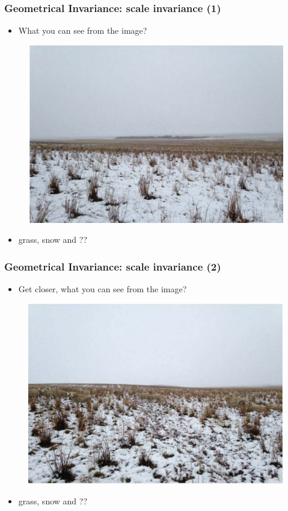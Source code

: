 \begin{frame}
\frametitle {Geometrical Invariance: scale invariance (1)}
\begin{itemize}
	\item {What you can see from the image?}
\end{itemize}
\begin{figure}
	{\includegraphics[width=0.7\linewidth]{./figs/scale_sheep1.pdf}}
\end{figure}
\begin{itemize}
	\item {grass, snow and ??}
\end{itemize}
\end{frame}

\begin{frame}
\frametitle {Geometrical Invariance: scale invariance (2)}
\begin{itemize}
	\item {Get closer, what you can see from the image?}
\end{itemize}
\begin{figure}
	{\includegraphics[width=0.65\linewidth]{./figs/scale_sheep2.pdf}}
\end{figure}
\begin{itemize}
	\item {grass, snow and ??}
\end{itemize}
\end{frame}

